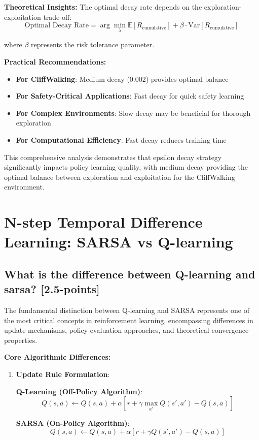 \documentclass[12pt]{article}
\begin{document}
{{{\textbf{Theoretical Insights:}
The optimal decay rate depends on the exploration-exploitation trade-off:
$$\text{Optimal Decay Rate} = \arg\min_{\lambda} \mathbb{E}[R_{\text{cumulative}}] + \beta \cdot \text{Var}[R_{\text{cumulative}}]$$

where $\beta$ represents the risk tolerance parameter.

\textbf{Practical Recommendations:}
\begin{itemize}
    \item \textbf{For CliffWalking}: Medium decay (0.002) provides optimal balance
    \item \textbf{For Safety-Critical Applications}: Fast decay for quick safety learning
    \item \textbf{For Complex Environments}: Slow decay may be beneficial for thorough exploration
    \item \textbf{For Computational Efficiency}: Fast decay reduces training time
\end{itemize}

This comprehensive analysis demonstrates that epsilon decay strategy significantly impacts policy learning quality, with medium decay providing the optimal balance between exploration and exploitation for the CliffWalking environment.

\section{N-step Temporal Difference Learning: SARSA vs Q-learning}
\subsection{What is the difference between Q-learning and sarsa? [2.5-points]}

The fundamental distinction between Q-learning and SARSA represents one of the most critical concepts in reinforcement learning, encompassing differences in update mechanisms, policy evaluation approaches, and theoretical convergence properties.

\textbf{Core Algorithmic Differences:}

\begin{enumerate}
    \item \textbf{Update Rule Formulation}:
    
    \textbf{Q-Learning (Off-Policy Algorithm)}:
    $$Q(s,a) \leftarrow Q(s,a) + \alpha[r + \gamma \max_{a'} Q(s',a') - Q(s,a)]$$
    
    \textbf{SARSA (On-Policy Algorithm)}:
    $$Q(s,a) \leftarrow Q(s,a) + \alpha[r + \gamma Q(s',a') - Q(s,a)]$$
    

\end{enumerate}}}}
\end{document}
